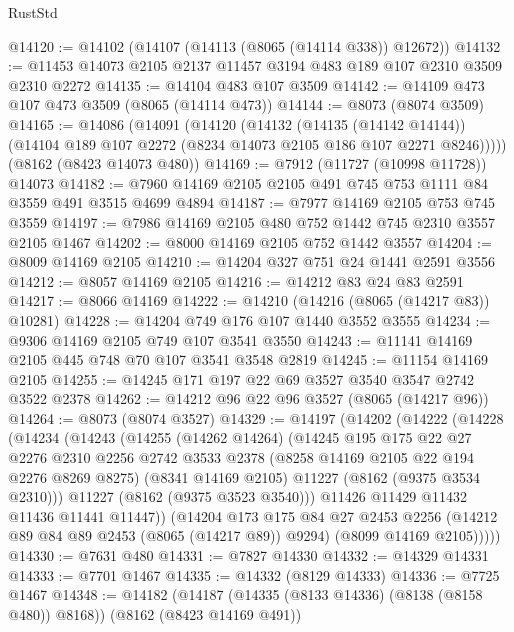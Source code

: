 \begin{lexlean}{RustStd}
\begin{coremodule}
@14120 := @14102 (@14107 (@14113 (@8065 (@14114 @338)) @12672))
@14132 := @11453 @14073 @2105 @2137 @11457 @3194 @483 @189 @107 @2310 @3509 @2310 @2272
@14135 := @14104 @483 @107 @3509
@14142 := @14109 @473 @107 @473 @3509 (@8065 (@14114 @473))
@14144 := @8073 (@8074 @3509)
@14165 := @14086
    (@14091
      (@14120
        (@14132
          (@14135 (@14142 @14144))
          (@14104 @189 @107 @2272 (@8234 @14073 @2105 @186 @107 @2271 @8246)))))
    (@8162 (@8423 @14073 @480))
@14169 := @7912 (@11727 (@10998 @11728)) @14073
@14182 := @7960 @14169 @2105 @2105 @491 @745 @753 @1111 @84 @3559 @491 @3515 @4699 @4894
@14187 := @7977 @14169 @2105 @753 @745 @3559
@14197 := @7986 @14169 @2105 @480 @752 @1442 @745 @2310 @3557 @2105 @1467
@14202 := @8000 @14169 @2105 @752 @1442 @3557
@14204 := @8009 @14169 @2105
@14210 := @14204 @327 @751 @24 @1441 @2591 @3556
@14212 := @8057 @14169 @2105
@14216 := @14212 @83 @24 @83 @2591
@14217 := @8066 @14169
@14222 := @14210 (@14216 (@8065 (@14217 @83)) @10281)
@14228 := @14204 @749 @176 @107 @1440 @3552 @3555
@14234 := @9306 @14169 @2105 @749 @107 @3541 @3550
@14243 := @11141 @14169 @2105 @445 @748 @70 @107 @3541 @3548 @2819
@14245 := @11154 @14169 @2105
@14255 := @14245 @171 @197 @22 @69 @3527 @3540 @3547 @2742 @3522 @2378
@14262 := @14212 @96 @22 @96 @3527 (@8065 (@14217 @96))
@14264 := @8073 (@8074 @3527)
@14329 := @14197
    (@14202
      (@14222
        (@14228
          (@14234
            (@14243
              (@14255
                (@14262 @14264)
                (@14245
                  @195
                  @175
                  @22
                  @27
                  @2276
                  @2310
                  @2256
                  @2742
                  @3533
                  @2378
                  (@8258 @14169 @2105 @22 @194 @2276 @8269 @8275)
                  (@8341 @14169 @2105)
                  @11227
                  (@8162 (@9375 @3534 @2310)))
                @11227
                (@8162 (@9375 @3523 @3540)))
              @11426
              @11429
              @11432
              @11436
              @11441
              @11447))
          (@14204
            @173
            @175
            @84
            @27
            @2453
            @2256
            (@14212 @89 @84 @89 @2453 (@8065 (@14217 @89)) @9294)
            (@8099 @14169 @2105)))))
@14330 := @7631 @480
@14331 := @7827 @14330
@14332 := @14329 @14331
@14333 := @7701 @1467
@14335 := @14332 (@8129 @14333)
@14336 := @7725 @1467
@14348 := @14182
    (@14187 (@14335 (@8133 @14336) (@8138 (@8158 @480)) @8168))
    (@8162 (@8423 @14169 @491))

\end{coremodule}
\end{lexlean}
